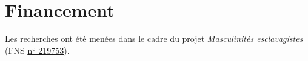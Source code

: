 \documentclass[final, fra]{anthology-ch}     %
\begin{document}



\section*{Financement}

Les recherches ont été menées dans le cadre du projet \textit{Masculinités esclavagistes} (FNS \href{https://data.snf.ch/grants/grant/219753}{\underline{n° 219753}}).

\printbibliography
\end{document}
